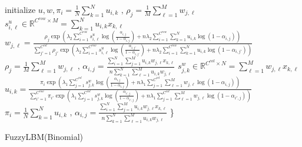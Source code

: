 \documentclass[fleqn,dvipdfmx,10pt]{beamer}
\begin{document}
\begin{frame}
  \begin{algorithm}[H]
    \begin{algorithmic}[1]
      \STATE initialize $u,w,\pi_i=\frac{1}{N}\sum_{k=1}^Nu_{i,k}\text{ , }\rho_j=\frac{1}{M}\sum_{\ell=1}^Mw_{j,\ell}$
      \REPEAT
      \STATE $s^{u}_{i,\ell}\in\mathbb{R}^{C^{row}\times M}=\sum_{k=1}^N u_{i,k} x_{k,\ell}$
      \REPEAT
      \STATE $w_{j,\ell}=\frac{\rho_j\exp\left(\lambda_2\sum_{i=1}^{C^{row}} s^{u}_{i,\ell}\log(\frac{\alpha_{i,j}}{1-\alpha_{i,j}})
        +n\lambda_2\sum_{i=1}^{C^{row}}\sum_{k=1}^N u_{i,k}\log(1-\alpha_{i,j})\right)}
             {\sum_{j'=1}^{C^{col}} \rho_{j'}\exp\left(\lambda_2\sum_{i=1}^{C^{row}}s^{u}_{i,\ell}
               \log(\frac{\alpha_{i,j'}}{1-\alpha_{i,j'}})
               +n\lambda_2\sum_{i=1}^{C^{row}}\sum_{k=1}^N u_{i,k}\log(1-\alpha_{i,j'})\right)}$
             \STATE $\rho_j=\frac{1}{M}\sum_{\ell=1}^Mw_{j,\ell}\text{ , }\alpha_{i,j}=\frac{\sum_{i=1}^N\sum_{j=1}^Mu_{i,k}w_{j,\ell}x_{k,\ell}}{n\sum_{k=1}^N\sum_{\ell=1}^Mu_{i,k}w_{j,\ell}}$
             \STATE $s^{w}_{j,k}\in\mathbb{R}^{C^{col}\times N}=\sum_{\ell=1}^M w_{j,\ell} x_{k,\ell}$
             \REPEAT
             \STATE $u_{i,k}=\frac{\pi_i\exp\left(\lambda_1\sum_{j=1}^{C^{col}}s^{w}_{j,k}
               \log(\frac{\alpha_{i,j}}{1-\alpha_{i,j}})
               +n\lambda_1\sum_{j=1}^{C^{col}}\sum_{\ell=1}^M w_{j,\ell}\log(1-\alpha_{i,j})\right)}
                    {\sum_{i'=1}^{C^{row}} \pi_{i'}\exp\left(\lambda_1\sum_{j=1}^{C^{col}}s^{w}_{j,k}
                      \log(\frac{\alpha_{i',j}}{1-\alpha_{i',j}})
                      +n\lambda_1\sum_{j=1}^{C^{col}}\sum_{\ell=1}^M w_{j,\ell}\log(1-\alpha_{i',j})\right)}$
                    \STATE $\pi_i=\frac{1}{N}\sum_{k=1}^Nu_{i,k}\text{ , }\alpha_{i,j}=\frac{\sum_{i=1}^N\sum_{j=1}^Mu_{i,k}w_{j,\ell}x_{k,\ell}}{n\sum_{k=1}^N\sum_{\ell=1}^Mu_{i,k}w_{j,\ell}}$
                    \}
    \end{algorithmic}
    \caption{FuzzyLBM(Binomial)}
  \end{algorithm}
\end{frame}
\end{document}
